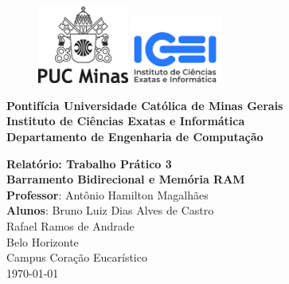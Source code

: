 \thispagestyle{empty} %

\begin{figure}[t]
    \includegraphics[width=3cm]{images/logo-puc-minas.png}
    \hspace{0.02\textwidth}
    \vline%
    \hspace{0.04\textwidth}
    \includegraphics[width=3cm]{images/logo-icei.jpeg}
\end{figure}

\hrulefill%
\vspace{\baselineskip}

\Large\noindent
\textbf{Pontifícia Universidade Católica de Minas Gerais} \\
\textbf{Instituto de Ciências Exatas e Informática} \\
\textbf{Departamento de Engenharia de Computação}

\begin{center}
    \vfill
    \Huge\textbf{Relatório: Trabalho Prático 3} \\
    \vspace{0.5cm}
    \Large\textbf{Barramento Bidirecional e Memória RAM} \\
    \vspace{1cm}
    \large \textbf{Professor}: Antônio Hamilton Magalhães\\
    \vspace{0.5cm}
    \large \textbf{Alunos}: Bruno Luiz Dias Alves de Castro \\
    \large \hspace{0.40cm} Rafael Ramos de Andrade \\
    \vfill
    \large Belo Horizonte \\ Campus Coração Eucarístico \\
    \vspace{\baselineskip}
    \large \today
\end{center}